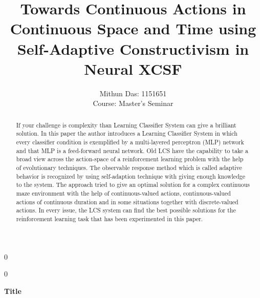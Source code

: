 \documentclass[12pt]{article}
\newcommand{\blind}{0}
\begin{document}
{\fontsize{2.5}{4}\selectfont}
%




\blind
{
  \title{\bf 
 Towards Continuous Actions in Continuous Space and Time using Self-Adaptive Constructivism in Neural XCSF
}
  \author{Mithun Das: 1151651{}\\
    Course: Master's Seminar\\
}
  \maketitle
} \fi

\blind
{
  \bigskip
  \bigskip
  \bigskip
  \begin{center}
    {\LARGE\bf Title}
\end{center}
  \medskip
} \fi

\bigskip
\begin{Note}
\end{Note}




\begin{abstract}
If your challenge is complexity than Learning Classifier System can give a brilliant solution. In this paper the author introduces a Learning Classifier System in which every classifier condition is exemplified by a multi-layered perceptron (MLP) network and that MLP is a feed-forward neural network. Old LCS have the capability to take a broad view across the action-space of a reinforcement learning problem with the help of evolutionary techniques. The observable response method which is called adaptive behavior is recognized by using self-adaption technique with giving enough knowledge to the system. The approach tried to give an optimal solution for a complex continuous maze environment with the help of continuous-valued actions, continuous-valued actions of continuous duration and in some situations together with discrete-valued actions. In every issue, the LCS system can find the best possible solutions for the reinforcement learning task that has been experimented in this paper.  
\end{abstract}
\end{document}
